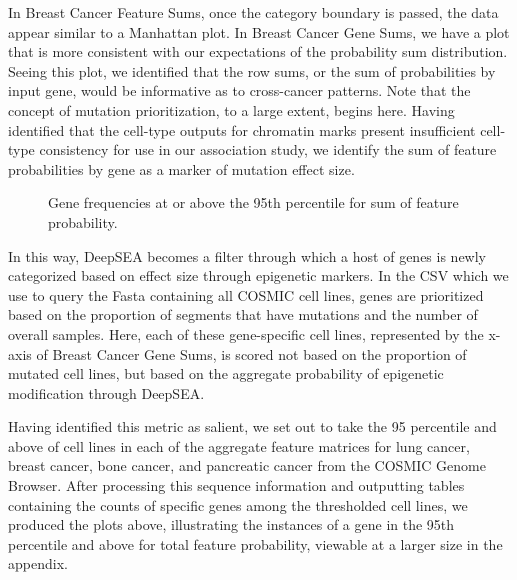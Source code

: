 \documentclass{article}
\begin{document}
In Breast Cancer Feature Sums, once the category boundary is passed, the data appear similar to a Manhattan plot. In Breast Cancer Gene Sums, we have a plot that is more consistent with our expectations of the probability sum distribution. Seeing this plot, we identified that the row sums, or the sum of probabilities by input gene, would be informative as to cross-cancer patterns. Note that the concept of mutation prioritization, to a large extent, begins here. Having identified that the cell-type outputs for chromatin marks present insufficient cell-type consistency for use in our association study, we identify the sum of feature probabilities by gene as a marker of mutation effect size. 
\begin{figure}[h!]
  \caption{Gene frequencies at or above the 95th percentile for sum of feature probability.}
  \label{fig:key}
\end{figure}

In this way, DeepSEA becomes a filter through which a host of genes is newly categorized based on effect size through epigenetic markers. In the CSV which we use to query the Fasta containing all COSMIC cell lines, genes are prioritized based on the proportion of segments that have mutations and the number of overall samples. Here, each of these gene-specific cell lines, represented by the x-axis of Breast Cancer Gene Sums,  is scored not based on the proportion of mutated cell lines, but based on the aggregate probability of epigenetic modification through DeepSEA. 

Having identified this metric as salient, we set out to take the 95 percentile and above of cell lines in each of the aggregate feature matrices for lung cancer, breast cancer, bone cancer, and pancreatic cancer from the COSMIC Genome Browser. After processing this sequence information and outputting tables containing the counts of specific genes among the thresholded cell lines, we produced the plots above, illustrating the instances of a gene in the 95th percentile and above for total feature probability, viewable at a larger size in the appendix. 
\end{document}
